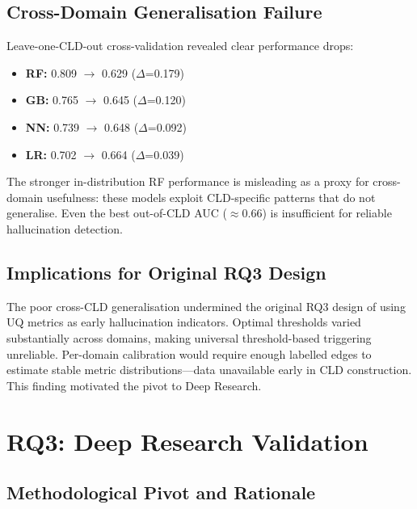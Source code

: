 \subsection{Cross-Domain Generalisation Failure}

Leave-one-CLD-out cross-validation revealed clear performance drops:
\begin{itemize}[noitemsep]
    \item \textbf{RF:} 0.809 $\rightarrow$ 0.629 ($\Delta$=0.179)
    \item \textbf{GB:} 0.765 $\rightarrow$ 0.645 ($\Delta$=0.120)
    \item \textbf{NN:} 0.739 $\rightarrow$ 0.648 ($\Delta$=0.092)
    \item \textbf{LR:} 0.702 $\rightarrow$ 0.664 ($\Delta$=0.039)
\end{itemize}
The stronger in-distribution RF performance is misleading as a proxy for cross-domain usefulness: these models exploit CLD-specific patterns that do not generalise. Even the best out-of-CLD AUC ($\approx$0.66) is insufficient for reliable hallucination detection.

\subsection{Implications for Original RQ3 Design}

The poor cross-CLD generalisation undermined the original RQ3 design of using UQ metrics as early hallucination indicators. Optimal thresholds varied substantially across domains, making universal threshold-based triggering unreliable. Per-domain calibration would require enough labelled edges to estimate stable metric distributions---data unavailable early in CLD construction. This finding motivated the pivot to Deep Research.

\section{RQ3: Deep Research Validation}
\label{sec:discussion_rq3}
\label{sec:rq3_pivot}

\subsection{Methodological Pivot and Rationale}

